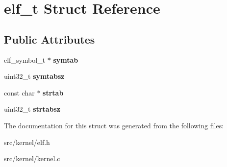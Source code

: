 \hypertarget{structelf__t}{}\section{elf\+\_\+t Struct Reference}
\label{structelf__t}
\subsection*{Public Attributes}
\begin{DoxyCompactItemize}
\item 
\mbox{\label{structelf__t_a33012e0a8175069c68b8b8269f222a62}} 
elf\+\_\+symbol\+\_\+t $\ast$ {\bfseries symtab}
\item 
\mbox{\label{structelf__t_a7d3ceb1baca42e11c9727eb6281aadff}} 
uint32\+\_\+t {\bfseries symtabsz}
\item 
\mbox{\label{structelf__t_a3473187e8a9512b5d70d7200d5590225}} 
const char $\ast$ {\bfseries strtab}
\item 
\mbox{\label{structelf__t_ad600b56a313e857604efc0c5f98219c0}} 
uint32\+\_\+t {\bfseries strtabsz}
\end{DoxyCompactItemize}


The documentation for this struct was generated from the following files\+:\begin{DoxyCompactItemize}
\item 
src/kernel/elf.\+h\item 
src/kernel/kernel.\+c\end{DoxyCompactItemize}
